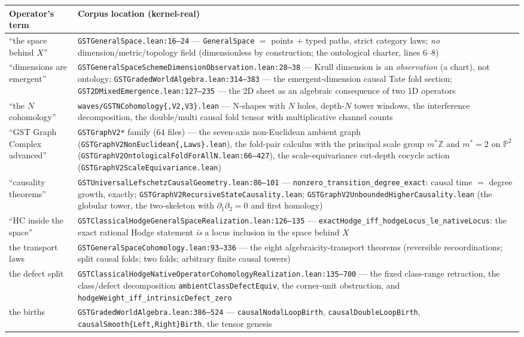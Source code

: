 \documentclass[11pt]{article}
\begin{document}
\begin{longtable}{p{5.4cm}p{9.6cm}}
\toprule
\textbf{Operator's term} & \textbf{Corpus location (kernel-real)} \\
\midrule
``the space behind $X$'' & \texttt{GSTGeneralSpace.lean:16--24} — \texttt{GeneralSpace} $=$ points $+$ typed paths, strict category laws; \emph{no} dimension/metric/topology field (dimensionless by construction; the ontological charter, lines 6--8) \\
``dimensions are emergent'' & \texttt{GSTGeneralSpaceSchemeDimensionObservation.lean:28--38} — Krull dimension is an \emph{observation} (a chart), not ontology; \texttt{GSTGradedWorldAlgebra.lean:314--383} — the emergent-dimension causal Tate fold section; \texttt{GST2DMixedEmergence.lean:127--235} — the 2D sheet as an algebraic consequence of two 1D operators \\
``the $N$ cohomology'' & \texttt{waves/GSTNCohomology\{,V2,V3\}.lean} — N-shapes with $N$ holes, depth-$N$ tower windows, the interference decomposition, the double/multi causal fold tensor with multiplicative channel counts \\
``GST Graph Complex advanced'' & \texttt{GSTGraphV2*} family (64 files) — the seven-axis non-Euclidean ambient graph (\texttt{GSTGraphV2NonEuclidean\{,Laws\}.lean}), the fold-pair calculus with the principal scale group $m^*\mathbb{Z}$ and $m^*=2$ on $\mathbb{P}^2$ (\texttt{GSTGraphV2OntologicalFoldForAllN.lean:66--427}), the scale-equivariance cut-depth cocycle action (\texttt{GSTGraphV2ScaleEquivariance.lean}) \\
``causality theorems'' & \texttt{GSTUniversalLefschetzCausalGeometry.lean:86--101} — \texttt{nonzero\_transition\_degree\_exact}: causal time $=$ degree growth, exactly; \texttt{GSTGraphV2RecursiveStateCausality.lean}; \texttt{GSTGraphV2UnboundedHigherCausality.lean} (the globular tower, the two-skeleton with $\partial_1\partial_2=0$ and first homology) \\
``HC inside the space'' & \texttt{GSTClassicalHodgeGeneralSpaceRealization.lean:126--135} — \texttt{exactHodge\_iff\_hodgeLocus\_le\_nativeLocus}: the exact rational Hodge statement \emph{is} a locus inclusion in the space behind $X$ \\
the transport laws & \texttt{GSTGeneralSpaceCohomology.lean:93--336} — the eight algebraicity-transport theorems (reversible recoordinations; split causal folds; two folds; arbitrary finite causal towers) \\
the defect split & \texttt{GSTClassicalHodgeNativeOperatorCohomologyRealization.lean:135--700} — the fixed class-range retraction, the class/defect decomposition \texttt{ambientClassDefectEquiv}, the corner-unit obstruction, and \texttt{hodgeWeight\_iff\_intrinsicDefect\_zero} \\
the births & \texttt{GSTGradedWorldAlgebra.lean:386--524} — \texttt{causalNodalLoopBirth}, \texttt{causalDoubleLoopBirth}, \texttt{causalSmooth\{Left,Right\}Birth}, the tensor genesis \\
\bottomrule
\end{longtable}
\end{document}
